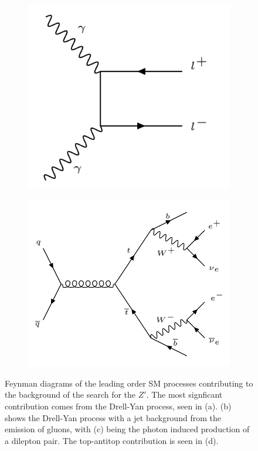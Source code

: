 \documentclass{article}
\begin{document}
\begin{figure}[h]
\begin{subfigure}{.25\textwidth}
        \includegraphics[scale = 0.2]{images/PI.png}
        \caption{}
        \label{fig:bckgFeynman_PI}
    \end{subfigure}	
    \begin{subfigure}{.35\textwidth}
        \includegraphics[height=\textwidth]{images/ttbar.png}
        \caption{}
        \label{fig:bckgFeynman_ttbar}
    \end{subfigure}
    \caption{Feynman diagrams of the leading order SM processes contributing to the background of the search for the $Z'$. The most signficant contribution comes from the Drell-Yan process, seen in (a). (b) shows the Drell-Yan process with a jet background from the emission of gluons, with (c) being the photon induced production of a dilepton pair. The top-antitop contribution is seen in (d).\label{fig:bckgFeynman2}}
\end{figure}
\end{document}
